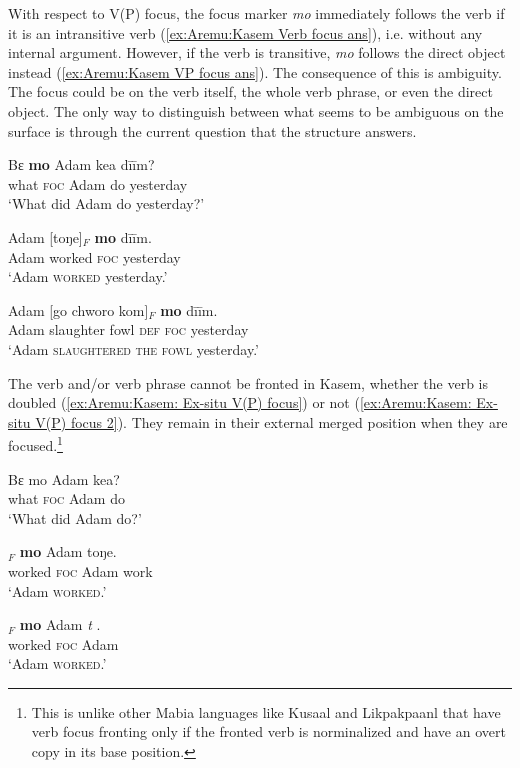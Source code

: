 \documentclass[output=paper,colorlinks,citecolor=brown,draftmode
]{langscibook}
\begin{document}
\z 


With respect to V(P) focus, the focus marker \textit{mo} immediately follows the verb if it is an intransitive verb (\ref{ex:Aremu:Kasem Verb focus ans}), i.e. without any internal argument. However, if the verb is transitive, \textit{mo} follows the direct object instead (\ref{ex:Aremu:Kasem VP focus ans}). The consequence of this is ambiguity. The focus could be on the verb itself, the whole verb phrase, or even the direct object. The only way to distinguish between what seems to be ambiguous on the surface is through the current question that the structure answers.

\ea \label{ex:Aremu:3rdEx}
\begin{xlist}

\ex \label{ex:Aremu:Kasem VP focus} 
    \gll Bɛ \textbf{mo} Adam kea dīīm?\\
	   what \textsc{foc} Adam do yesterday\\
	\glt`What did Adam do yesterday?'

\ex \label{ex:Aremu:Kasem Verb focus ans} 
     \gll Adam [toŋe]$_F$ \textbf{mo} dīīm.\\
	Adam  worked \textsc{foc} yesterday\\
	\glt `Adam \textsc{worked} yesterday.'

\ex \label{ex:Aremu:Kasem VP focus ans} 
\gll Adam [go chworo kom]$_F$ \textbf{mo} dīīm.\\
	   Adam slaughter fowl \textsc{def} \textsc{foc} yesterday\\
 \glt	 `Adam \textsc{slaughtered the fowl} yesterday.'

 \end{xlist}
\z 


The verb and/or verb phrase cannot be fronted in Kasem, whether the verb is doubled (\ref{ex:Aremu:Kasem: Ex-situ V(P) focus}) or not (\ref{ex:Aremu:Kasem: Ex-situ V(P) focus 2}). They remain in their external merged position when they are focused.\footnote{This is unlike other Mabia languages like Kusaal and Likpakpaanl that have verb focus fronting only if the fronted verb is norminalized and have an overt copy in its base position.}

\ea \label{ex:Aremu:4thEx}
\begin{xlist}

\ex 
\gll Bɛ mo Adam kea?\\
	   what \textsc{foc} Adam do\\
\glt	`What did Adam do?'
    
\ex
\gll *[Toŋe]$_F$ \textbf{mo} Adam toŋe.\label{ex:Aremu:Kasem: Ex-situ V(P) focus}\\
	   worked \textsc{foc} Adam work\\
\glt `Adam \textsc{worked}.'

\ex
\gll *[Toŋe]$_F$ \textbf{mo} Adam \textit{t} .\label{ex:Aremu:Kasem: Ex-situ V(P) focus 2}\\
	   worked \textsc{foc} Adam \\
\glt `Adam \textsc{worked}.'

\end{xlist}
\z 
\end{document}
